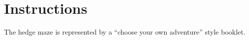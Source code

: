 \documentclass[green]{gl2018}
\begin{document}
\name{\gLabyrinth{}}
\newcommand{\areastart}[1]{ \begin{huge}{\bf \#{#1}} \end{huge} \\}
\newenvironment{fromhere}{\begin{center}\begin{itshape}}{\end{itshape}\end{center}}
\newenvironment{location}[1]{\begin{minipage}{\textwidth}\areastart{#1}\\}{\end{minipage}\vspace{1in}}
\section*{Instructions}
The hedge maze is represented by a “choose your own adventure” style booklet. 
\end{document}
